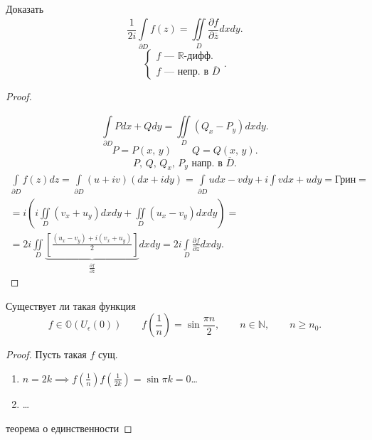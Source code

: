  \begin{problem}
Доказать
\[
	\frac{1}{2i} \int\limits_{\partial D}^{} f(z)=
	\iint\limits_{D}^{}  \frac{\partial f}{\partial \overline{z}} 
	dxdy
.\] 
\[
\left\{
	\begin{aligned}
		f \text{ --- } \mathbb{R}\text{-дифф.}\\
		f \text{ --- непр. в } \overline{D}
	\end{aligned}
	\right.
.\] 
\end{problem}
\begin{proof}
\begin{figure}[ht]
    \centering
    \caption{}
    \label{fig:2}
\end{figure}
\[
\int\limits_{\partial D}^{} Pdx+Qdy= \iint\limits_{D}^{} 
(Q_x-P_y) dxdy
.\] 
\[
	P=P(x,\,y)\qquad Q=Q(x,\,y)
.\] 
\[
P,\,Q,\,Q_x,\,P_y \text{ напр. в } \overline{D}
.\] 
\begin{multline*}
	\int\limits_{\partial D}^{} f(z)dz= \int\limits_{\partial D}^{} (u +i v)(dx+i dy)=
\int\limits_{\partial D}^{} udx - v dy +i \int\limits_{}^{} v dx+udy
=\text{Грин}= \\=i\left( i \iint\limits_{D}^{} \left( v_x+u_y \right)dxdy 
+ \iint\limits_{D}^{} (u_x-v_y)dxdy \right)=\\=
2i \iint\limits_{D}^{} \underbrace{\left[ \frac{(u_x-v_y)+i (v_x+u_y)}{2} \right]}_{\frac{\partial f}{\partial \overline{z}} } dxdy=2i \int\limits_{D}^{} \frac{\partial f}{\partial z} dxdy  
.\end{multline*} 
\end{proof}
\begin{problem}
Существует ли такая функция
\[
	f \in \mathbb{O}(U_\epsilon (0)) \qquad
	f\left(\frac{1}{n}\right)=\sin \frac{\pi n}{2},
	\qquad n \in \mathbb{N}, \qquad n\ge n_0
.\] 
\end{problem}
\begin{proof}
	Пусть такая $f$ сущ.
	\begin{enumerate}
		\item $n=2k \implies f\left(\frac{1}{n}\right)
			f\left( \frac{1}{2k} \right) =\sin \pi k =0$\ldots 
		\item \ldots
	\end{enumerate} 
	теорема о единственности
\end{proof}

